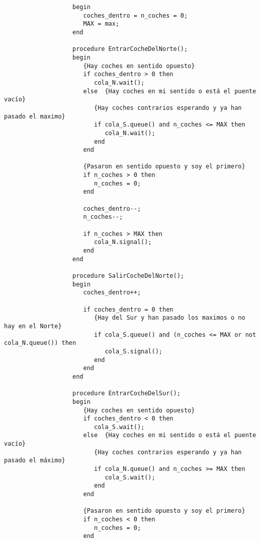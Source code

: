 \begin{ejercicio}
\begin{enumerate}
\begin{verbatim}
                   begin
                      coches_dentro = n_coches = 0;
                      MAX = max;
                   end

                   procedure EntrarCocheDelNorte();
                   begin
                      {Hay coches en sentido opuesto}
                      if coches_dentro > 0 then
                         cola_N.wait();
                      else  {Hay coches en mi sentido o está el puente vacío}
                         {Hay coches contrarios esperando y ya han pasado el maximo}
                         if cola_S.queue() and n_coches <= MAX then
                            cola_N.wait();
                         end
                      end

                      {Pasaron en sentido opuesto y soy el primero}
                      if n_coches > 0 then
                         n_coches = 0;
                      end

                      coches_dentro--;
                      n_coches--;

                      if n_coches > MAX then
                         cola_N.signal();
                      end
                   end

                   procedure SalirCocheDelNorte();
                   begin
                      coches_dentro++;

                      if coches_dentro = 0 then
                         {Hay del Sur y han pasado los maximos o no hay en el Norte}
                         if cola_S.queue() and (n_coches <= MAX or not cola_N.queue()) then
                            cola_S.signal();
                         end
                      end
                   end

                   procedure EntrarCocheDelSur();
                   begin
                      {Hay coches en sentido opuesto}
                      if coches_dentro < 0 then
                         cola_S.wait();
                      else  {Hay coches en mi sentido o está el puente vacío}
                         {Hay coches contrarios esperando y ya han pasado el máximo}
                         if cola_N.queue() and n_coches >= MAX then
                            cola_S.wait();
                         end
                      end

                      {Pasaron en sentido opuesto y soy el primero}
                      if n_coches < 0 then
                         n_coches = 0;
                      end


\end{verbatim}
\end{enumerate}
\end{ejercicio}
